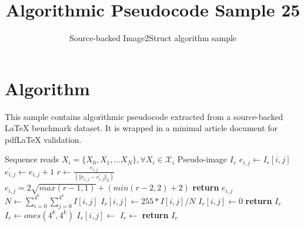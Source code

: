 \documentclass[11pt]{article}
\title{Algorithmic Pseudocode Sample 25}
\author{Source-backed Image2Struct algorithm sample}
\date{}
\begin{document}
\maketitle
\section{Algorithm}
This sample contains algorithmic pseudocode extracted from a source-backed LaTeX benchmark dataset. It is wrapped in a minimal article document for pdfLaTeX validation.

\begin{algorithm}[htbp]
\caption{Source-backed algorithmic procedure}
\begin{algorithm}
[t]
\caption{Constructing a pseudo-image from a whole genome sample for a given k-mer size $k$.}\begin{algorithmic}
\Require Sequence reads $X_i = \{X_0, X_1, \ldots X_N\}, \forall X_i \in \mathcal{X}_i$
\Ensure Pseudo-image $I_r$
\State $e_{i,j} \gets I_r[i,j]$ 
\State $e^\prime_{i,j} \gets e_{i,j} + 1$ 
\State $r \gets \frac{e_{i,j}}{(\Vert e_{i,j} - e^{\prime}_{i,j} \Vert_2)}$ 
\State $e_{i,j} = 2 \sqrt{max(r - 1, 1)} + (min(r-2,2) + 2)$
\State \textbf{return} $e_{i,j}$
\EndProcedure
{}
\State $N\gets\sum_{i=0}^{4^k}{\sum_{j=0}^{4^k}{I[i,j]}}$
\State$I_r[i,j]\gets 255*I[i,j]/N$
\Else
\State$I_r[i,j]\gets 0$
\EndIf
\EndFor
\EndFor
\State \textbf{return} $I_r$
\EndProcedure
\State $I_r \gets ones(4^k,4^k)$ 
 
 
\State $I_r[i,j]\gets$
\EndFor
\EndFor
\State $I_r\gets$ 
\State \textbf{return} $I_r$
\end{algorithmic}
\end{algorithm}
\end{algorithm}
\end{document}

